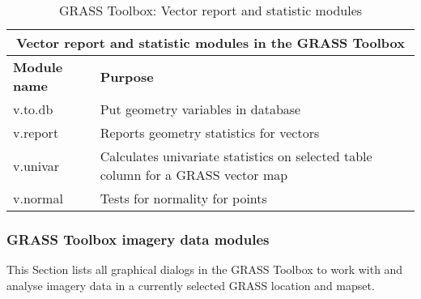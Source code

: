 \begin{table}[ht]
\centering
\caption{GRASS Toolbox: Vector report and statistic modules}\medskip
 \begin{tabular}{|p{4cm}|p{12cm}|}
  \hline \multicolumn{2}{|c|}{\textbf{Vector report and statistic modules in the GRASS
  Toolbox}} \\
  \hline \textbf{Module name} & \textbf{Purpose} \\
  \hline v.to.db & Put geometry variables in database \\
  \hline v.report & Reports geometry statistics for vectors \\
  \hline v.univar & Calculates univariate statistics on selected table column
  for a GRASS vector map \\
  \hline v.normal & Tests for normality for points\\
\hline
\end{tabular}
\end{table}

\clearpage

\subsubsection{GRASS Toolbox imagery data modules}

This Section lists all graphical dialogs in the GRASS Toolbox to work with
and analyse imagery data in a currently selected GRASS location and mapset.

